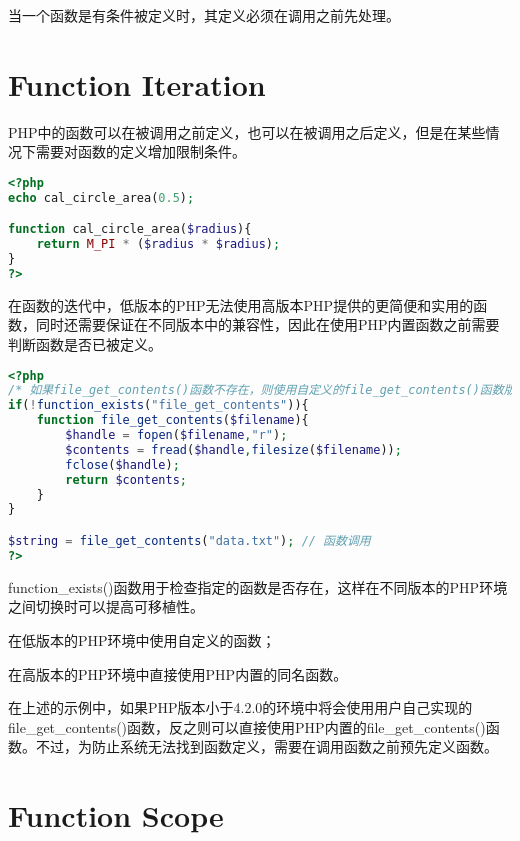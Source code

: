 当一个函数是有条件被定义时，其定义必须在调用之前先处理。

\section{Function Iteration}

PHP中的函数可以在被调用之前定义，也可以在被调用之后定义，但是在某些情况下需要对函数的定义增加限制条件。

\begin{lstlisting}[language=PHP]
<?php
echo cal_circle_area(0.5);

function cal_circle_area($radius){
	return M_PI * ($radius * $radius);
}
?>
\end{lstlisting}

在函数的迭代中，低版本的PHP无法使用高版本PHP提供的更简便和实用的函数，同时还需要保证在不同版本中的兼容性，因此在使用PHP内置函数之前需要判断函数是否已被定义。

\begin{lstlisting}[language=PHP]
<?php
/* 如果file_get_contents()函数不存在，则使用自定义的file_get_contents()函数版本 */
if(!function_exists("file_get_contents")){
	function file_get_contents($filename){
		$handle = fopen($filename,"r");
		$contents = fread($handle,filesize($filename));
		fclose($handle);
		return $contents;
	}
}

$string = file_get_contents("data.txt"); // 函数调用
?>
\end{lstlisting}


function\_exists()函数用于检查指定的函数是否存在，这样在不同版本的PHP环境之间切换时可以提高可移植性。

\begin{compactitem}
\item 在低版本的PHP环境中使用自定义的函数；
\item 在高版本的PHP环境中直接使用PHP内置的同名函数。
\end{compactitem}

在上述的示例中，如果PHP版本小于4.2.0的环境中将会使用用户自己实现的file\_get\_contents()函数，反之则可以直接使用PHP内置的file\_get\_contents()函数。不过，为防止系统无法找到函数定义，需要在调用函数之前预先定义函数。






\section{Function Scope}

